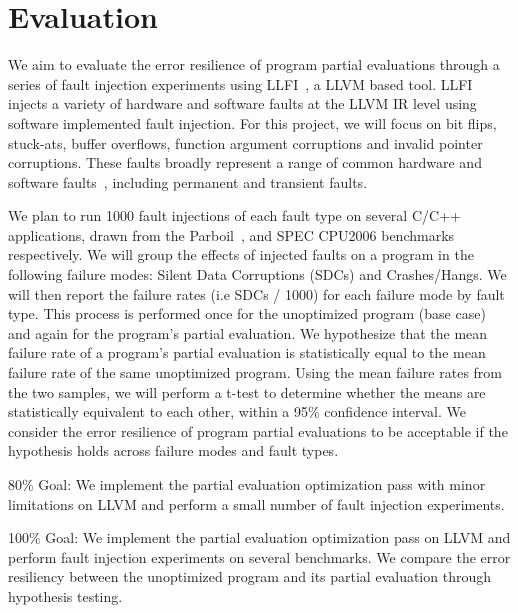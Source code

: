 \section{Evaluation}

We aim to evaluate the error resilience of program partial evaluations through a series of fault injection experiments using LLFI~\cite{LLFI}, a LLVM based tool.
LLFI injects a variety of hardware and software faults at the LLVM IR level using software implemented fault injection.
For this project, we will focus on bit flips, stuck-ats, buffer overflows, function argument corruptions and invalid pointer corruptions.
These faults broadly represent a range of common hardware and software faults~\cite{V2005}, including permanent and transient faults. 

We plan to run 1000 fault injections of each fault type on several C/C++ applications, drawn from the Parboil~\cite{Parboil}, and SPEC CPU2006 benchmarks~\cite{SPEC} respectively.
We will group the effects of injected faults on a program in the following failure modes: Silent Data Corruptions (SDCs) and Crashes/Hangs.
We will then report the failure rates (i.e SDCs / 1000) for each failure mode by fault type.
This process is performed once for the unoptimized program (base case) and again for the program’s partial evaluation.
We hypothesize that the mean failure rate of a program’s partial evaluation is statistically equal to the mean failure rate of the same unoptimized program.
Using the mean failure rates from the two samples, we will perform a t-test to determine whether the means are statistically equivalent to each other, within a 95\% confidence interval.
We consider the error resilience of program partial evaluations to be acceptable if the hypothesis holds across failure modes and fault types. 

80\% Goal: We implement the partial evaluation optimization pass with minor limitations on LLVM and perform a small number of fault injection experiments.

100\% Goal: We implement the partial evaluation optimization pass on LLVM and perform fault injection experiments on several benchmarks. We compare the error resiliency between the unoptimized program and its partial evaluation through hypothesis testing. 
